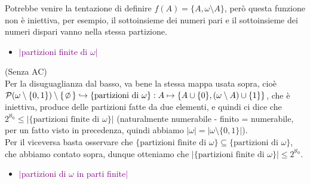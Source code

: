\begin{note}
	Potrebbe venire la tentazione di definire $f(A) = \{A, \omega\setminus A\}$, per\`o questa funzione non \`e iniettiva, per esempio, il sottoinsieme dei numeri pari e il sottoinsieme dei numeri dispari vanno nella stessa partizione.
\end{note}

\begin{itemize}
	\item \textcolor{purple}{$|$partizioni finite di $\omega|$}
\end{itemize}

\begin{soln}
	(Senza AC)\\
	Per la disuguaglianza dal basso, va bene la stessa mappa usata sopra, cio\`e $\ps(\omega\setminus\{0,1\})\setminus\{\emptyset\} \hookrightarrow \{\text{partizioni di $\omega$}\} : A \mapsto \{A\cup \{0\},(\omega\setminus A)\cup \{1\}\}$, che \`e iniettiva, produce delle partizioni fatte da due elementi, e quindi ci dice che $2^{\aleph_0} \leq |\{\text{partizioni finite di $\omega$}\}|$ (naturalmente numerabile - finito = numerabile, per un fatto visto in precedenza, quindi abbiamo $|\omega| = |\omega \setminus\{0,1\}|$).\\
	Per il viceversa basta osservare che $\{\text{partizioni finite di $\omega$}\} \subseteq \{\text{partizioni di $\omega$}\}$, che abbiamo contato sopra, dunque otteniamo che $|\{\text{partizioni finite di $\omega$}\}| \leq 2^{\aleph_0}$.
\end{soln}
\pagebreak
\begin{itemize}
	\item \textcolor{purple}{$|$partizioni di $\omega$ in parti finite$|$}
\end{itemize}

